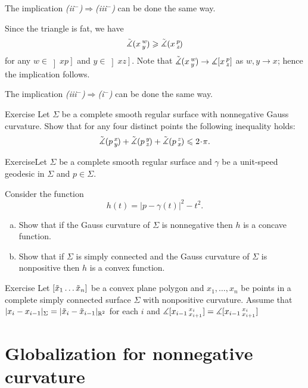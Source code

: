 The implication \textit{(ii$^{-}$)$\Longrightarrow$(iii$^{-}$)} can be done the same way.

Since the triangle is fat, we have 
\[\angk xwy \ge \angk xpz\]
for any $w\in \left]xp\right]$ and $y\in \left]xz\right]$.
Note that $\angk xwy\to \measuredangle\hinge xpz$ as $w,y\to x$; hence the implication follows.

The implication \textit{(iii$^{-}$)$\Longrightarrow$(i$^{-}$)} can be done the same way.
\qeds

\begin{thm}{Exercise}
Let $\Sigma$ be a complete smooth regular surface with nonnegative Gauss curvature.
Show that for any four distinct points the following inequality holds:
\[\angk pxy+\angk pyz+\angk pzx\le2\cdot \pi.\]

\end{thm}

\begin{thm}{Exercise}Let $\Sigma$ be a complete smooth regular surface
and $\gamma$ be a unit-speed geodesic in $\Sigma$ and $p\in\Sigma$.

Consider the function
\[h(t)=|p-\gamma(t)|^2-t^2.\]

\begin{enumerate}[(a)]
\item Show that if the Gauss curvature of $\Sigma$ is nonnegative then $h$ is a concave function.
\item Show that if $\Sigma$ is simply connected and the Gauss curvature of $\Sigma$ is nonpositive then $h$ is a convex function.
\end{enumerate}
\end{thm}

\begin{thm}{Exercise}
Let $[\~x_1\dots\~x_n]$ be a convex plane polygon and
$x_1,\dots,x_n$ be points in a complete simply connected surface $\Sigma$ with nonpositive curvature.
Assume that
$|x_i-x_{i-1}|_\Sigma=|\~x_i-\~x_{i-1}|_{\RR^2}$ for each $i$ and
$\measuredangle\hinge{x_{i-1}}{x_i}{x_{i+1}}=\measuredangle\hinge{x_{i-1}}{x_i}{x_{i+1}}$

\end{thm}





\section{Globalization for nonnegative curvature}

